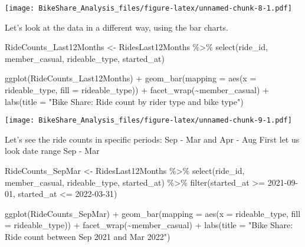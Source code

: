 \documentclass[
]{article}
\newenvironment{Shaded}{\begin{snugshade}}{\end{snugshade}}
\newcommand{\AttributeTok}[1]{\textcolor[rgb]{0.77,0.63,0.00}{#1}}
\newcommand{\FunctionTok}[1]{\textcolor[rgb]{0.00,0.00,0.00}{#1}}
\newcommand{\NormalTok}[1]{#1}
\newcommand{\OtherTok}[1]{\textcolor[rgb]{0.56,0.35,0.01}{#1}}
\newcommand{\SpecialCharTok}[1]{\textcolor[rgb]{0.00,0.00,0.00}{#1}}
\newcommand{\StringTok}[1]{\textcolor[rgb]{0.31,0.60,0.02}{#1}}
\begin{document}
\texttt{[image: BikeShare\_Analysis\_files/figure-latex/unnamed-chunk-8-1.pdf]}

Let's look at the data in a different way, using the bar charts.

\begin{Shaded}
\begin{Highlighting}[]
\NormalTok{RideCounts\_Last12Months }\OtherTok{\textless{}{-}}\NormalTok{ RidesLast12Months }\SpecialCharTok{\%\textgreater{}\%}
  \FunctionTok{select}\NormalTok{(ride\_id, member\_casual, rideable\_type, started\_at)}

\FunctionTok{ggplot}\NormalTok{(RideCounts\_Last12Months) }\SpecialCharTok{+} \FunctionTok{geom\_bar}\NormalTok{(}\AttributeTok{mapping =} \FunctionTok{aes}\NormalTok{(}\AttributeTok{x =}\NormalTok{ rideable\_type, }\AttributeTok{fill =}\NormalTok{ rideable\_type)) }\SpecialCharTok{+} \FunctionTok{facet\_wrap}\NormalTok{(}\SpecialCharTok{\textasciitilde{}}\NormalTok{member\_casual) }\SpecialCharTok{+} \FunctionTok{labs}\NormalTok{(}\AttributeTok{title =} \StringTok{"Bike Share: Ride count by rider type and bike type"}\NormalTok{)}
\end{Highlighting}
\end{Shaded}

\texttt{[image: BikeShare\_Analysis\_files/figure-latex/unnamed-chunk-9-1.pdf]}

Let's see the ride counts in specific periods: Sep - Mar and Apr - Aug
First let us look date range Sep - Mar

\begin{Shaded}
\begin{Highlighting}[]
\NormalTok{RideCounts\_SepMar }\OtherTok{\textless{}{-}}\NormalTok{ RidesLast12Months }\SpecialCharTok{\%\textgreater{}\%}
  \FunctionTok{select}\NormalTok{(ride\_id, member\_casual, rideable\_type, started\_at) }\SpecialCharTok{\%\textgreater{}\%}
  \FunctionTok{filter}\NormalTok{(started\_at }\SpecialCharTok{\textgreater{}=} \StringTok{\textquotesingle{}2021{-}09{-}01\textquotesingle{}}\NormalTok{, started\_at }\SpecialCharTok{\textless{}=} \StringTok{\textquotesingle{}2022{-}03{-}31\textquotesingle{}}\NormalTok{)}

\FunctionTok{ggplot}\NormalTok{(RideCounts\_SepMar) }\SpecialCharTok{+} \FunctionTok{geom\_bar}\NormalTok{(}\AttributeTok{mapping =} \FunctionTok{aes}\NormalTok{(}\AttributeTok{x =}\NormalTok{ rideable\_type, }\AttributeTok{fill =}\NormalTok{ rideable\_type)) }\SpecialCharTok{+} \FunctionTok{facet\_wrap}\NormalTok{(}\SpecialCharTok{\textasciitilde{}}\NormalTok{member\_casual) }\SpecialCharTok{+} \FunctionTok{labs}\NormalTok{(}\AttributeTok{title =} \StringTok{"Bike Share: Ride count between Sep 2021 and Mar 2022"}\NormalTok{) }
\end{Highlighting}
\end{Shaded}
\end{document}
